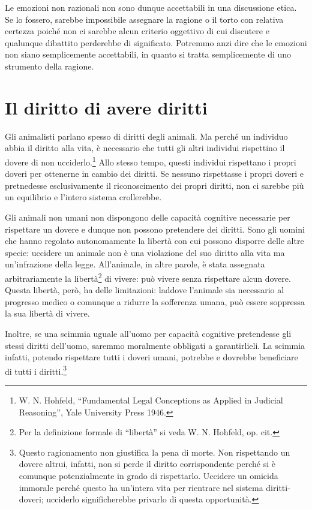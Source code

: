 \documentclass[a4paper,11pt,oneside,article]{memoir}
\begin{document}
Le emozioni non razionali non sono dunque accettabili in una discussione etica.
Se lo fossero, sarebbe impossibile assegnare la ragione o il torto con relativa
certezza poiché non ci sarebbe alcun criterio oggettivo di cui discutere e
qualunque dibattito perderebbe di significato. Potremmo anzi dire che le
emozioni non siano semplicemente accettabili, in quanto si tratta semplicemente
di uno strumento della ragione.

\chapter{Il diritto di avere diritti}

Gli animalisti parlano spesso di diritti degli animali. Ma perché un individuo
abbia il diritto alla vita, è necessario che tutti gli altri individui
rispettino il dovere di non ucciderlo.\footnote{W. N. Hohfeld, ``Fundamental
Legal Conceptions as Applied in Judicial Reasoning'', Yale University Press
1946.} Allo stesso tempo, questi individui rispettano i propri doveri per
ottenerne in cambio dei diritti. Se nessuno rispettasse i propri doveri e
pretnedesse esclusivamente il riconoscimento dei propri diritti, non ci sarebbe
più un equilibrio e l'intero sistema crollerebbe.

Gli animali non umani non dispongono delle capacità cognitive necessarie per
rispettare un dovere e dunque non possono pretendere dei diritti. Sono gli
uomini che hanno regolato autonomamente la libertà con cui possono disporre
delle altre specie: uccidere un animale non è una violazione del suo diritto
alla vita ma un'infrazione della legge. All'animale, in altre parole, è stata
assegnata arbitrariamente la libertà\footnote{Per la definizione formale di
``libertà'' si veda W. N. Hohfeld, op. cit.} di vivere: può vivere senza
rispettare alcun dovere. Questa libertà, però, ha delle limitazioni: laddove
l'animale sia necessario al progresso medico o comunque a ridurre la sofferenza
umana, può essere soppressa la sua libertà di vivere.

Inoltre, se una scimmia uguale all'uomo per capacità cognitive pretendesse gli
stessi diritti dell'uomo, saremmo moralmente obbligati a garantirlieli. La
scimmia infatti, potendo rispettare tutti i doveri umani, potrebbe e dovrebbe
beneficiare di tutti i diritti.\footnote{Questo ragionamento non giustifica la
pena di morte. Non rispettando un dovere altrui, infatti, non si perde il
diritto corrispondente perché si è comunque potenzialmente in grado di
rispettarlo. Uccidere un omicida immorale perché questo ha un'intera vita per
rientrare nel sistema diritti-doveri; ucciderlo significherebbe privarlo di
questa opportunità.}
\end{document}
